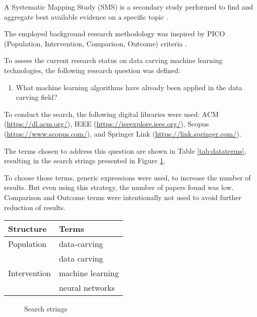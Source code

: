 A Systematic Mapping Study (SMS) is a secondary study performed to 
find and aggregate best available evidence on a specific topic \cite{petersen_systematic_2008}.

The employed background research methodology was inspired by PICO (Population, Intervention, Comparison, Outcome) criteria \cite{kitchenham_guidelines_2007}.

To assess the current research status on data carving machine learning technologies, the following research question was defined:

\begin{enumerate}[itemindent=\parindent,label=\textbf{RQ\arabic*.}]
    \item What machine learning algorithms have already been applied in the data carving field?
\end{enumerate}

To conduct the search, the following digital libraries were used: 
ACM (\url{https://dl.acm.org/}),
IEEE (\url{https://ieeexplore.ieee.org/}),
Scopus (\url{https://www.scopus.com/}),
and
Springer Link (\url{https://link.springer.com/}).

The terms chosen to address this question are shown in Table \ref{tab:dataterms}, resulting in the search strings presented in  Figure \ref{fig:datasearchstring}.

To choose those terms, generic expressions were used, to increase the number of results. But even using this strategy, the number of papers found was low. Comparison and Outcome terms were intentionally not used to avoid further reduction of results.

\begin{table*}[!ht]
    \centering
    \caption{Terms used}
    \label{tab:dataterms}
    \begin{tabular}{ l  l }
      Structure 	& Terms 		\\
      \hline\hline
      Population 	& data-carving \\   
                    & data carving \\
      \hline
      Intervention 	& machine learning \\
                    & neural networks \\
      \hline
    \end{tabular}
\end{table*}

\begin{figure}[!ht]
  \centering
  \caption{Search strings}
  \label{fig:datasearchstring}
\end{figure}


